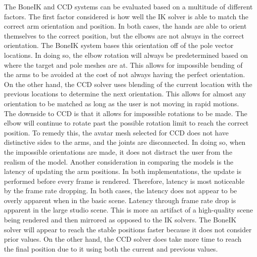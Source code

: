 \documentclass{vgtc}                          %
\begin{document}
    The BoneIK and CCD systems can be evaluated based on a multitude of different factors. The first factor considered is how well the IK solver is able to match the correct arm orientation and position. In both cases, the hands are able to orient themselves to the correct position, but the elbows are not always in the correct orientation. The BoneIK system bases this orientation off of the pole vector locations. In doing so, the elbow rotation will always be predetermined based on where the target and pole meshes are at. This allows for impossible bending of the arms to be avoided at the cost of not always having the perfect orientation. On the other hand, the CCD solver uses blending of the current location with the previous locations to determine the next orientation. This allows for almost any orientation to be matched as long as the user is not moving in rapid motions. The downside to CCD is that it allows for impossible rotations to be made. The elbow will continue to rotate past the possible rotation limit to reach the correct position. To remedy this, the avatar mesh selected for CCD does not have distinctive sides to the arms, and the joints are disconnected. In doing so, when the impossible orientations are made, it does not distract the user from the realism of the model. Another consideration in comparing the models is the latency of updating the arm positions. In both implementations, the update is performed before every frame is rendered. Therefore, latency is most noticeable by the frame rate dropping. In both cases, the latency does not appear to be overly apparent when in the basic scene. Latency through frame rate drop is apparent in the large studio scene. This is more an artifact of a high-quality scene being rendered and then mirrored as opposed to the IK solvers. The BoneIK solver will appear to reach the stable positions faster because it does not consider prior values. On the other hand, the CCD solver does take more time to reach the final position due to it using both the current and previous values. 
\end{document}

